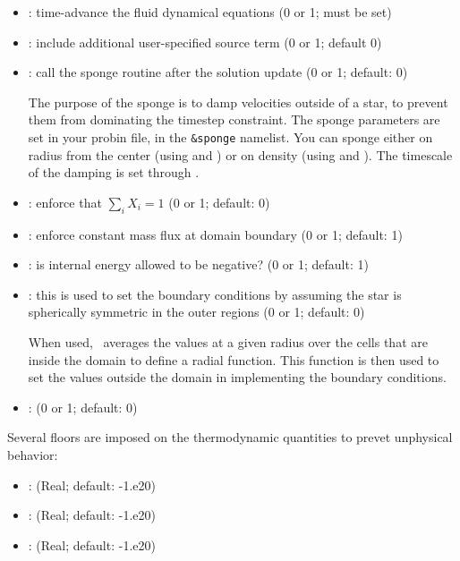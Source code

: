 \begin{itemize}
\item {}: time-advance the fluid dynamical
  equations (0 or 1; must be set)

\item {}: include additional user-specified
  source term (0 or 1; default 0)
  
\item {}: call the sponge routine
  after the solution update (0 or 1; default: 0)

  The purpose of the sponge is to damp velocities outside of a star, to
  prevent them from dominating the timestep constraint. The sponge parameters
  are set in your probin file, in the {\tt \&sponge} namelist. You can sponge either
  on radius from the center (using  and
  ) or on density (using 
  and ). The timescale of the damping is
  set through .
  
\item {}: enforce that $\sum_i X_i = 1$
  (0 or 1; default: 0)
  
\item {}: enforce constant mass flux at
  domain boundary (0 or 1; default: 1)
  
\item {}: is internal energy allowed to be
  negative? (0 or 1; default: 1)
  
\item {}: this is used to set the boundary
  conditions by assuming the star is spherically symmetric in
  the outer regions (0 or 1; default: 0)

  When used, \castro\ averages the values at a given radius over the
  cells that are inside the domain to define a radial function.  This
  function is then used to set the values outside the domain in
  implementing the boundary conditions.
  
\item {}: (0 or 1; default: 0)
\end{itemize}

Several floors are imposed on the thermodynamic quantities to prevet unphysical
behavior:
\begin{itemize}
\item {}: (Real; default: -1.e20)
\item {}: (Real; default: -1.e20)
\item {}: (Real; default: -1.e20)
\end{itemize}


